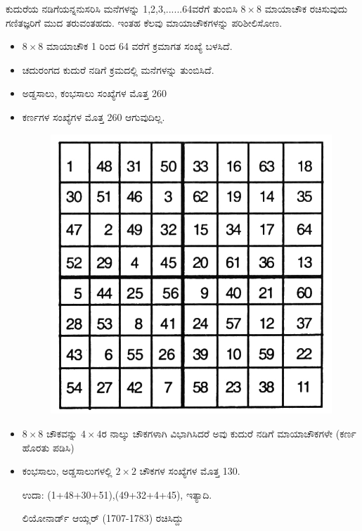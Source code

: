 ಕುದುರೆಯ ನಡಿಗೆಯನ್ನನುಸರಿಸಿ ಮನೆಗಳನ್ನು 1,2,3,......64ವರೆಗೆ ತುಂಬಿಸಿ $8 \times 8$ ಮಾಯಾಚೌಕ ರಚಿಸುವುದು ಗಣಿತಜ್ಞರಿಗೆ ಮುದ ತರುವಂತಹದು. ಇಂತಹ ಕೆಲವು ಮಾಯಾಚೌಕಗಳನ್ನು ಪರಿಶೀಲಿಸೋಣ.
\begin{itemize}
	\item $8 \times 8$ ಮಾಯಾಚೌಕ 1 ರಿಂದ 64 ವರೆಗೆ ಕ್ರಮಾಗತ ಸಂಖ್ಯೆ ಬಳಸಿದೆ.
	\item ಚದುರಂಗದ ಕುದುರೆ ನಡಿಗೆ ಕ್ರಮದಲ್ಲಿ ಮನೆಗಳನ್ನು ತುಂಬಿಸಿದೆ.
	\item ಅಡ್ಡಸಾಲು, ಕಂಭಸಾಲು ಸಂಖ್ಯೆಗಳ ಮೊತ್ತ 260
	\item ಕರ್ಣಗಳ ಸಂಖ್ಯೆಗಳ ಮೊತ್ತ 260 ಆಗುವುದಿಲ್ಲ.
	\begin{figure}[H]
	\includegraphics{src/figures/chap6/fig6.3.jpg}
	\end{figure}
	\item $8 \times 8$ ಚೌಕವನ್ನು $4 \times 4$ರ ನಾಲ್ಕು ಚೌಕಗಳಾಗಿ ವಿಭಾಗಿಸಿದರೆ ಅವು ಕುದುರೆ ನಡಿಗೆ ಮಾಯಾಚೌಕಗಳೇ (ಕರ್ಣ ಹೊರತು ಪಡಿಸಿ)
	\item ಕಂಭಸಾಲು, ಅಡ್ಡಸಾಲುಗಳಲ್ಲಿ $2 \times 2$ ಚೌಕಗಳ ಸಂಖ್ಯೆಗಳ ಮೊತ್ತ 130.

	ಉದಾ: (1+48+30+51),(49+32+4+45), ಇತ್ಯಾದಿ.

	ಲಿಯೋನಾರ್ಡ್ ಆಯ್ಲರ್ (1707-1783) ರಚಿಸಿದ್ದು
\end{itemize}

